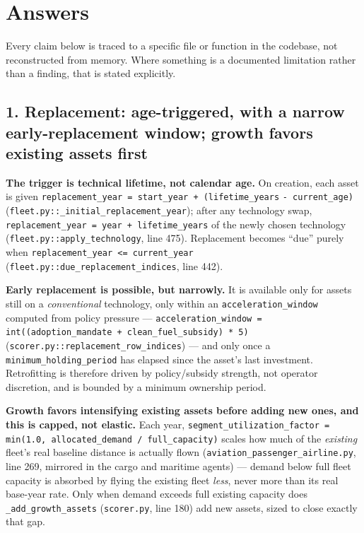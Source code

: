 \documentclass{article}
\begin{document}
\section*{Answers}

Every claim below is traced to a specific file or function in the
codebase, not reconstructed from memory. Where something is a documented
limitation rather than a finding, that is stated explicitly.

\subsection*{1. Replacement: age-triggered, with a narrow early-replacement
window; growth favors existing assets first}

\textbf{The trigger is technical lifetime, not calendar age.} On creation,
each asset is given \verb|replacement_year = start_year + (lifetime_years|
\verb|- current_age)| (\texttt{fleet.py::\_initial\_replacement\_year}); after
any technology swap, \verb|replacement_year = year + lifetime_years| of the
newly chosen technology (\texttt{fleet.py::apply\_technology}, line 475).
Replacement becomes ``due'' purely when
\verb|replacement_year <= current_year|
(\texttt{fleet.py::due\_replacement\_indices}, line 442).

\textbf{Early replacement is possible, but narrowly.} It is available only
for assets still on a \emph{conventional} technology, only within an
\verb|acceleration_window| computed from policy pressure ---
\verb|acceleration_window = int((adoption_mandate + clean_fuel_subsidy) * 5)|
(\texttt{scorer.py::replacement\_row\_indices}) --- and only once a
\verb|minimum_holding_period| has elapsed since the asset's last investment.
Retrofitting is therefore driven by policy/subsidy strength, not operator
discretion, and is bounded by a minimum ownership period.

\textbf{Growth favors intensifying existing assets before adding new
ones, and this is capped, not elastic.} Each year,
\verb|segment_utilization_factor = min(1.0, allocated_demand / full_capacity)|
scales how much of the \emph{existing} fleet's real baseline distance is
actually flown (\texttt{aviation\_passenger\_airline.py}, line 269, mirrored
in the cargo and maritime agents) --- demand below full fleet capacity is
absorbed by flying the existing fleet \emph{less}, never more than its real
base-year rate. Only when demand exceeds full existing capacity does
\verb|_add_growth_assets| (\texttt{scorer.py}, line 180) add new assets,
sized to close exactly that gap.
\end{document}
